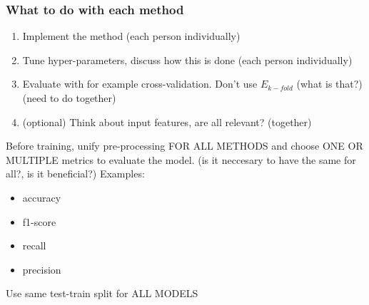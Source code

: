 \subsubsection{What to do with each method}
\begin{enumerate}
    \item Implement the method (each person individually)
    \item Tune hyper-parameters, discuss how this is done (each person individually)
    \item Evaluate with for example cross-validation. Don't use $E_{k-fold}$ (what is that?) (need to do together)
    \item (optional) Think about input features, are all relevant? (together)
\end{enumerate}

Before training, unify pre-processing FOR ALL METHODS and choose ONE OR MULTIPLE metrics to evaluate the model.
(is it neccesary to have the same for all?, is it beneficial?) Examples:
\begin{itemize}
    \item accuracy
    \item f1-score
    \item recall
    \item precision
\end{itemize}

Use same test-train split for ALL MODELS